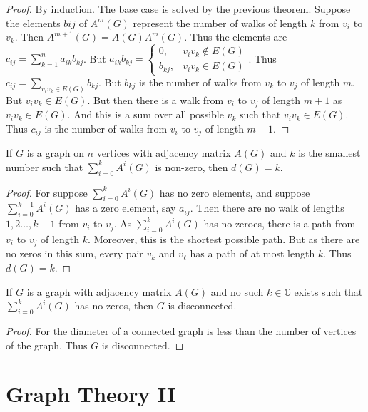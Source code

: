         \begin{proof}
        By induction. The base case is solved by the previous theorem. Suppose the elements $b{ij}$ of $A^m(G)$ represent the number of walks of length $k$ from $v_i$ to $v_k$. Then $A^{m+1}(G)=A(G)A^m(G)$. Thus the elements are $c_{ij} = \sum_{k=1}^{n} a_{ik}b_{kj}$. But $a_{ik}b_{kj} = \begin{cases} 0, & v_i v_k \notin E(G) \\ b_{kj}, & v_i v_k \in E(G)\end{cases}$. Thus $c_{ij} = \underset{v_i v_k \in E(G)}\sum b_{kj}$. But $b_{kj}$ is the number of walks from $v_k$ to $v_j$ of length $m$. But $v_i v_k \in E(G)$. But then there is a walk from $v_i$ to $v_j$ of length $m+1$ as $v_iv_k \in E(G)$. And this is a sum over all possible $v_k$ such that $v_iv_k \in E(G)$. Thus $c_{ij}$ is the number of walks from $v_i$ to $v_j$ of length $m+1$.
        \end{proof}
        \begin{theorem}
        If $G$ is a graph on $n$ vertices with adjacency matrix $A(G)$ and $k$ is the smallest number such that $\sum_{i=0}^{k} A^i(G)$ is non-zero, then $d(G) = k$.
        \end{theorem}
        \begin{proof}
        For suppose $\sum_{i=0}^{k}A^i(G)$ has no zero elements, and suppose $\sum_{i=0}^{k-1}A^i(G)$ has a zero element, say $a_{ij}$. Then there are no walk of lengths $1,2 \hdots, k-1$ from $v_i$ to $v_j$. As $\sum_{i=0}^{k} A^i(G)$ has no zeroes, there is a path from $v_{i}$ to $v_{j}$ of length $k$. Moreover, this is the shortest possible path. But as there are no zeros in this sum, every pair $v_k$ and $v_{\ell}$ has a path of at most length $k$. Thus $d(G)=k$.
        \end{proof}
        \begin{theorem}
        If $G$ is a graph with adjacency matrix $A(G)$ and no such $k\in \mathbb{G}$ exists such that $\sum_{i=0}^{k}A^i(G)$ has no zeros, then $G$ is disconnected.
        \end{theorem}
        \begin{proof}
        For the diameter of a connected graph is less than the number of vertices of the graph. Thus $G$ is disconnected.
        \end{proof}
    \section{Graph Theory II}
